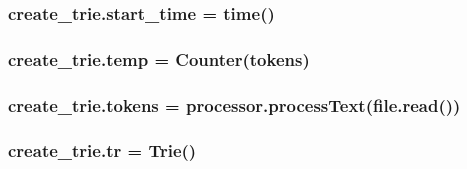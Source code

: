 \subsubsection[{\texorpdfstring{start\+\_\+time}{start_time}}]{\setlength{\rightskip}{0pt plus 5cm}create\+\_\+trie.\+start\+\_\+time = time()}\hypertarget{namespacecreate__trie_a16d2378d2d7fd59088a9721ad77da106}{}\label{namespacecreate__trie_a16d2378d2d7fd59088a9721ad77da106}
\subsubsection[{\texorpdfstring{temp}{temp}}]{\setlength{\rightskip}{0pt plus 5cm}create\+\_\+trie.\+temp = Counter({\bf tokens})}\hypertarget{namespacecreate__trie_a1cfb0e74650de85b305af8d0471c199e}{}\label{namespacecreate__trie_a1cfb0e74650de85b305af8d0471c199e}
\subsubsection[{\texorpdfstring{tokens}{tokens}}]{\setlength{\rightskip}{0pt plus 5cm}create\+\_\+trie.\+tokens = processor.\+process\+Text(file.\+read())}\hypertarget{namespacecreate__trie_a37f17bf189828d28800bf79f7cb9b9a9}{}\label{namespacecreate__trie_a37f17bf189828d28800bf79f7cb9b9a9}
\subsubsection[{\texorpdfstring{tr}{tr}}]{\setlength{\rightskip}{0pt plus 5cm}create\+\_\+trie.\+tr = {\bf Trie}()}\hypertarget{namespacecreate__trie_a41f1ff7b2420aeb95360264a00701e6c}{}\label{namespacecreate__trie_a41f1ff7b2420aeb95360264a00701e6c}
